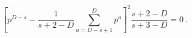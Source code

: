 \begin{equation}
\left[ p^{D-s} -\frac{
1}{s+2-D}\sum_{a=D-s+1}^Dp^a\right]^2\frac{s+2-D}{s+3-D}=0\, .
\end{equation} 

